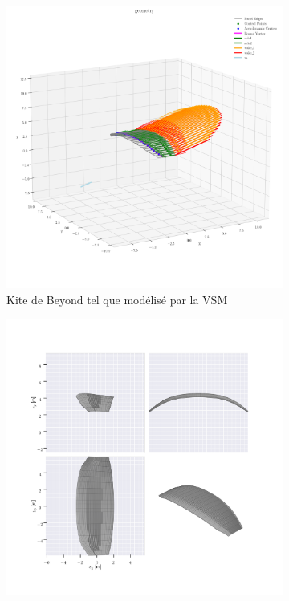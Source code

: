 \documentclass[conference]{IEEEtran}
\begin{document}
\begin{figure}[H]
    \centering
    \begin{subfigure}[b]{0.45\textwidth}
        \centering
        \includegraphics[width=\textwidth]{Pics/kite beyond vsm.png}
        \caption{Kite de Beyond tel que modélisé par la VSM}
        \label{fig:Kite de Beyond tel que modélisé par la VSM}
    \end{subfigure}
    \hfill
    \begin{subfigure}[b]{0.45\textwidth}
        \centering
        \includegraphics[width=\textwidth]{Pics/kite beyond vlm.png}

\end{subfigure}
\end{figure}
\end{document}
